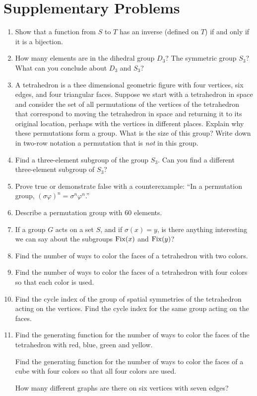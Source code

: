 \section{Supplementary Problems}
\begin{enumerate}
\item Show that a function from $S$ to $T$ has an inverse (defined on $T$)
if and only if it is a bijection.

\item How many elements are in the dihedral group $D_3$?  The symmetric
group $S_3$?  What can you conclude about $D_3$ and $S_3$?

\item A tetrahedron is a thee dimensional geometric figure with four
vertices, six edges, and four triangular faces.  Suppose we start with a
tetrahedron in space and consider the set of all permutations of the
vertices of the tetrahedron that correspond to moving the tetrahedron in
space and returning it to its original location, perhaps with the
vertices in different places.  Explain why these permutations form a
group.  What is the size of this group?  Write down in two-row notation a
permutation that is {\em not} in this group.

\item Find a three-element subgroup of the group $S_3$.  Can you find a
different three-element subgroup of $S_3$?

\item  Prove true or demonstrate false with a counterexample:  ``In a
permutation group, $(\sigma\varphi)^n = \sigma^n\varphi^n$.''


\item Describe a permutation group with 60 elements.

\item If a group $G$ acts on a set $S$, and if $\sigma(x) =y$, is there
anything interesting we can say about the subgroups ${\rm Fix}(x)$ and
${\rm Fix}(y)$?

\item Find the number of ways to color the faces of a tetrahedron with
two colors.

\item Find the number of ways to color the faces of a tetrahedron with
four colors so that each color is used.

\item Find the cycle index of the group of spatial symmetries of the tetrahedron
acting on the vertices.  Find the cycle index for the same group acting on the
faces.

\item Find the generating function for the number of ways to color the faces of
the tetrahedron with red, blue, green and yellow.

\itemi Find the generating function for the number of ways to color the faces of a
cube with four colors so that all four colors are used.

\itemi How many different graphs are there on six vertices with seven edges?
\end{enumerate}